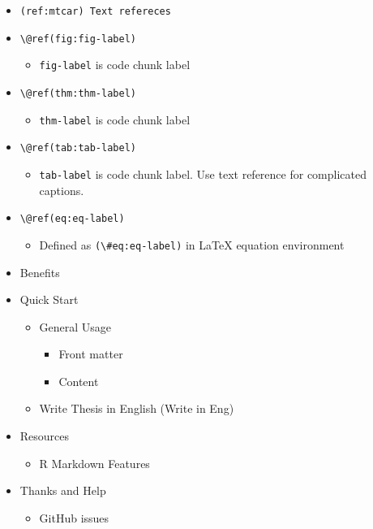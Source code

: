 \documentclass[oneside]{book}
\providecommand{\tightlist}{%
  \setlength{\itemsep}{0pt}\setlength{\parskip}{0pt}}
\theoremstyle{definition}
\theoremstyle{definition}
\theoremstyle{definition}
\theoremstyle{remark}
\begin{document}
\begin{itemize}
\tightlist
\item
  \texttt{(ref:mtcar)\ Text\ refereces}
\item
  \texttt{\textbackslash{}@ref(fig:fig-label)}

  \begin{itemize}
  \tightlist
  \item
    \texttt{fig-label} is code chunk label
  \end{itemize}
\item
  \texttt{\textbackslash{}@ref(thm:thm-label)}

  \begin{itemize}
  \tightlist
  \item
    \texttt{thm-label} is code chunk label
  \end{itemize}
\item
  \texttt{\textbackslash{}@ref(tab:tab-label)}

  \begin{itemize}
  \tightlist
  \item
    \texttt{tab-label} is code chunk label. Use text reference for
    complicated captions.
  \end{itemize}
\item
  \texttt{\textbackslash{}@ref(eq:eq-label)}

  \begin{itemize}
  \tightlist
  \item
    Defined as \texttt{(\textbackslash{}\#eq:eq-label)} in LaTeX
    equation environment
  \end{itemize}
\item
  Benefits
\item
  Quick Start

  \begin{itemize}
  \tightlist
  \item
    General Usage

    \begin{itemize}
    \tightlist
    \item
      Front matter
    \item
      Content
    \end{itemize}
  \item
    Write Thesis in English (Write in Eng)
  \end{itemize}
\item
  Resources

  \begin{itemize}
  \tightlist
  \item
    R Markdown Features
  \end{itemize}
\item
  Thanks and Help

  \begin{itemize}
  \tightlist
  \item
    GitHub issues
  \end{itemize}
\end{itemize}
\end{document}

